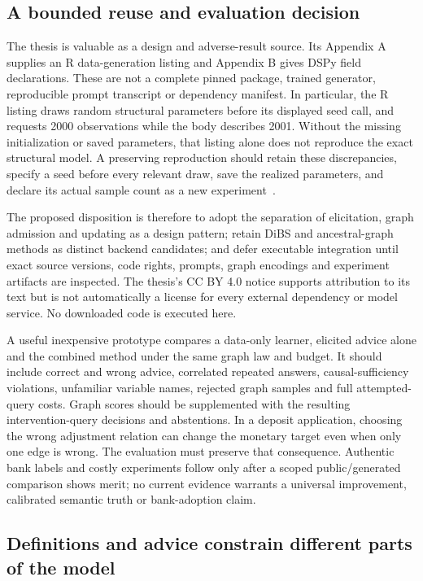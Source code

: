 \subsection{A bounded reuse and evaluation decision}
The thesis is valuable as a design and adverse-result source. Its Appendix A supplies an R data-generation listing and Appendix B gives DSPy field declarations. These are not a complete pinned package, trained generator, reproducible prompt transcript or dependency manifest. In particular, the R listing draws random structural parameters before its displayed seed call, and requests 2000 observations while the body describes 2001. Without the missing initialization or saved parameters, that listing alone does not reproduce the exact structural model. A preserving reproduction should retain these discrepancies, specify a seed before every relevant draw, save the realized parameters, and declare its actual sample count as a new experiment~\citep{exec18_videira_thesis}.

The proposed disposition is therefore to adopt the separation of elicitation, graph admission and updating as a design pattern; retain DiBS and ancestral-graph methods as distinct backend candidates; and defer executable integration until exact source versions, code rights, prompts, graph encodings and experiment artifacts are inspected. The thesis's CC BY 4.0 notice supports attribution to its text but is not automatically a license for every external dependency or model service. No downloaded code is executed here.

A useful inexpensive prototype compares a data-only learner, elicited advice alone and the combined method under the same graph law and budget. It should include correct and wrong advice, correlated repeated answers, causal-sufficiency violations, unfamiliar variable names, rejected graph samples and full attempted-query costs. Graph scores should be supplemented with the resulting intervention-query decisions and abstentions. In a deposit application, choosing the wrong adjustment relation can change the monetary target even when only one edge is wrong. The evaluation must preserve that consequence. Authentic bank labels and costly experiments follow only after a scoped public/generated comparison shows merit; no current evidence warrants a universal improvement, calibrated semantic truth or bank-adoption claim.
\subsection{Definitions and advice constrain different parts of the model}

